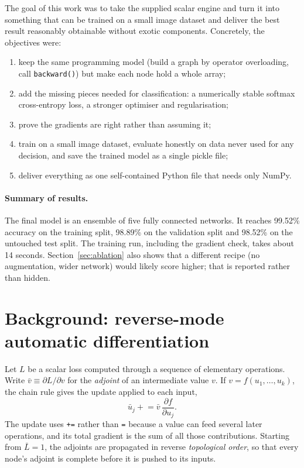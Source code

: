 \documentclass[11pt,a4paper]{article}
\newcommand{\code}[1]{\texttt{#1}}
\newcommand{\grad}[1]{\bar{#1}}
\begin{document}
The goal of this work was to take the supplied scalar engine and turn it into something that can be trained on a small image dataset and deliver the best result reasonably obtainable without exotic components. Concretely, the objectives were:
\begin{enumerate}
  \item keep the same programming model (build a graph by operator overloading, call \code{backward()}) but make each node hold a whole array;
  \item add the missing pieces needed for classification: a numerically stable softmax cross-entropy loss, a stronger optimiser and regularisation;
  \item prove the gradients are right rather than assuming it;
  \item train on a small image dataset, evaluate honestly on data never used for any decision, and save the trained model as a single pickle file;
  \item deliver everything as one self-contained Python file that needs only NumPy.
\end{enumerate}

\paragraph{Summary of results.} The final model is an ensemble of five fully connected networks. It reaches 99.52\% accuracy on the training split, 98.89\% on the validation split and 98.52\% on the untouched test split. The training run, including the gradient check, takes about 14 seconds. Section~\ref{sec:ablation} also shows that a different recipe (no augmentation, wider network) would likely score higher; that is reported rather than hidden.

\section{Background: reverse-mode automatic differentiation}
Let $L$ be a scalar loss computed through a sequence of elementary operations. Write $\grad{v}\equiv\partial L/\partial v$ for the \emph{adjoint} of an intermediate value $v$. If $v=f(u_1,\dots,u_k)$, the chain rule gives the update applied to each input,
\begin{equation}
  \grad{u}_j \mathrel{+}= \grad{v}\,\frac{\partial f}{\partial u_j}.
  \label{eq:chain}
\end{equation}
The update uses \code{+=} rather than \code{=} because a value can feed several later operations, and its total gradient is the sum of all those contributions. Starting from $\grad{L}=1$, the adjoints are propagated in reverse \emph{topological order}, so that every node's adjoint is complete before it is pushed to its inputs.
\end{document}
